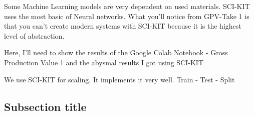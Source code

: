 Some Machine Learning models are very dependent on used materials. SCI-KIT uses the most basic of Neural networks. What you'll notice from GPV-Take 1 is that you can't create modern systems with SCI-KIT because it is the highest level of abstraction.

Here, I'll need to show the results of the Google Colab Notebook - Gross Production Value 1 and the abysmal results I got using SCI-KIT

We use SCI-KIT for scaling. It implements it very well. Train - Test - Split
\cite{ponce1989engineering}


\subsection{Subsection title}
